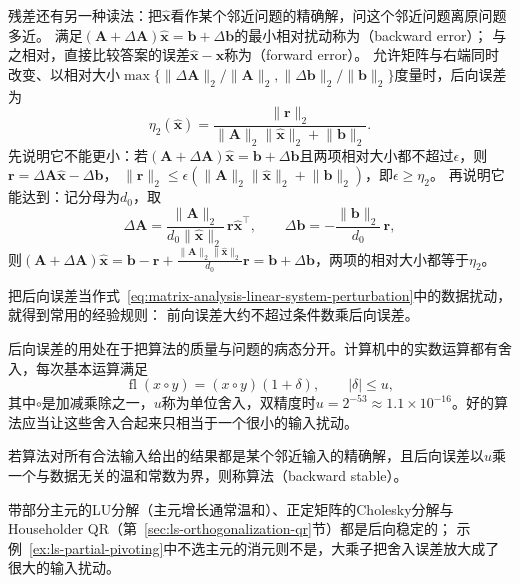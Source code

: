 残差还有另一种读法：把$\widehat{\bm x}$看作某个邻近问题的精确解，问这个邻近问题离原问题多近。
满足$(\bm A+\Delta\bm A)\widehat{\bm x}=\bm b+\Delta\bm b$的最小相对扰动称为（backward error）；
与之相对，直接比较答案的误差$\widehat{\bm x}-\bm x$称为（forward error）。
允许矩阵与右端同时改变、以相对大小$\max\{\lVert\Delta\bm A\rVert_2/\lVert\bm A\rVert_2,\lVert\Delta\bm b\rVert_2/\lVert\bm b\rVert_2\}$度量时，后向误差为
\begin{equation}
 \eta_2(\widehat{\bm x})
 =\frac{\lVert\bm r\rVert_2}
       {\lVert\bm A\rVert_2\lVert\widehat{\bm x}\rVert_2+\lVert\bm b\rVert_2}.
 \label{def:matrix-analysis-normwise-backward-error}
\end{equation}
先说明它不能更小：若$(\bm A+\Delta\bm A)\widehat{\bm x}=\bm b+\Delta\bm b$且两项相对大小都不超过$\epsilon$，则$\bm r=\Delta\bm A\widehat{\bm x}-\Delta\bm b$，
$\lVert\bm r\rVert_2\leq\epsilon(\lVert\bm A\rVert_2\lVert\widehat{\bm x}\rVert_2+\lVert\bm b\rVert_2)$，即$\epsilon\geq\eta_2$。
再说明它能达到：记分母为$d_0$，取
\[
 \Delta\bm A=\frac{\lVert\bm A\rVert_2}{d_0\lVert\widehat{\bm x}\rVert_2}\,\bm r\widehat{\bm x}^\top,\qquad
 \Delta\bm b=-\frac{\lVert\bm b\rVert_2}{d_0}\,\bm r ,
\]
则$(\bm A+\Delta\bm A)\widehat{\bm x}=\bm b-\bm r+\tfrac{\lVert\bm A\rVert_2\lVert\widehat{\bm x}\rVert_2}{d_0}\bm r=\bm b+\Delta\bm b$，两项的相对大小都等于$\eta_2$。

把后向误差当作式~\eqref{eq:matrix-analysis-linear-system-perturbation}中的数据扰动，就得到常用的经验规则：
前向误差大约不超过条件数乘后向误差。

后向误差的用处在于把算法的质量与问题的病态分开。计算机中的实数运算都有舍入，每次基本运算满足
\begin{equation}
 \operatorname{fl}(x\circ y)=(x\circ y)(1+\delta),
 \qquad |\delta|\leq u,
 \label{eq:ch06-floating-point-model}
\end{equation}
其中$\circ$是加减乘除之一，$u$称为单位舍入，双精度时$u=2^{-53}\approx1.1\times10^{-16}$。好的算法应当让这些舍入合起来只相当于一个很小的输入扰动。

\begin{definition}[后向稳定]
\label{def:matrix-analysis-backward-stability}
若算法对所有合法输入给出的结果都是某个邻近输入的精确解，且后向误差以$u$乘一个与数据无关的温和常数为界，则称算法（backward stable）。
\end{definition}
带部分主元的LU分解（主元增长通常温和）、正定矩阵的Cholesky分解与Householder QR（第~\ref{sec:ls-orthogonalization-qr}节）都是后向稳定的；
示例~\ref{ex:ls-partial-pivoting}中不选主元的消元则不是，大乘子把舍入误差放大成了很大的输入扰动。

